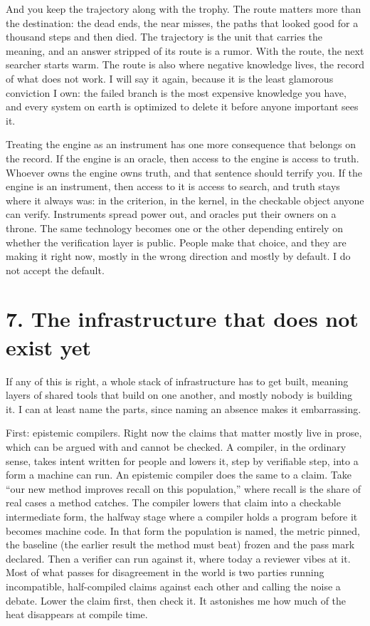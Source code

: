\documentclass[11pt]{article}
\begin{document}
And you keep the trajectory along with the trophy. The route matters more than the destination: the dead ends, the near misses, the paths that looked good for a thousand steps and then died. The trajectory is the unit that carries the meaning, and an answer stripped of its route is a rumor. With the route, the next searcher starts warm. The route is also where negative knowledge lives, the record of what does not work. I will say it again, because it is the least glamorous conviction I own: the failed branch is the most expensive knowledge you have, and every system on earth is optimized to delete it before anyone important sees it.

Treating the engine as an instrument has one more consequence that belongs on the record. If the engine is an oracle, then access to the engine is access to truth. Whoever owns the engine owns truth, and that sentence should terrify you. If the engine is an instrument, then access to it is access to search, and truth stays where it always was: in the criterion, in the kernel, in the checkable object anyone can verify. Instruments spread power out, and oracles put their owners on a throne. The same technology becomes one or the other depending entirely on whether the verification layer is public. People make that choice, and they are making it right now, mostly in the wrong direction and mostly by default. I do not accept the default.

\section*{7. The infrastructure that does not exist yet}

If any of this is right, a whole stack of infrastructure has to get built, meaning layers of shared tools that build on one another, and mostly nobody is building it. I can at least name the parts, since naming an absence makes it embarrassing.

First: epistemic compilers. Right now the claims that matter mostly live in prose, which can be argued with and cannot be checked. A compiler, in the ordinary sense, takes intent written for people and lowers it, step by verifiable step, into a form a machine can run. An epistemic compiler does the same to a claim. Take ``our new method improves recall on this population,'' where recall is the share of real cases a method catches. The compiler lowers that claim into a checkable intermediate form, the halfway stage where a compiler holds a program before it becomes machine code. In that form the population is named, the metric pinned, the baseline (the earlier result the method must beat) frozen and the pass mark declared. Then a verifier can run against it, where today a reviewer vibes at it. Most of what passes for disagreement in the world is two parties running incompatible, half-compiled claims against each other and calling the noise a debate. Lower the claim first, then check it. It astonishes me how much of the heat disappears at compile time.
\end{document}
